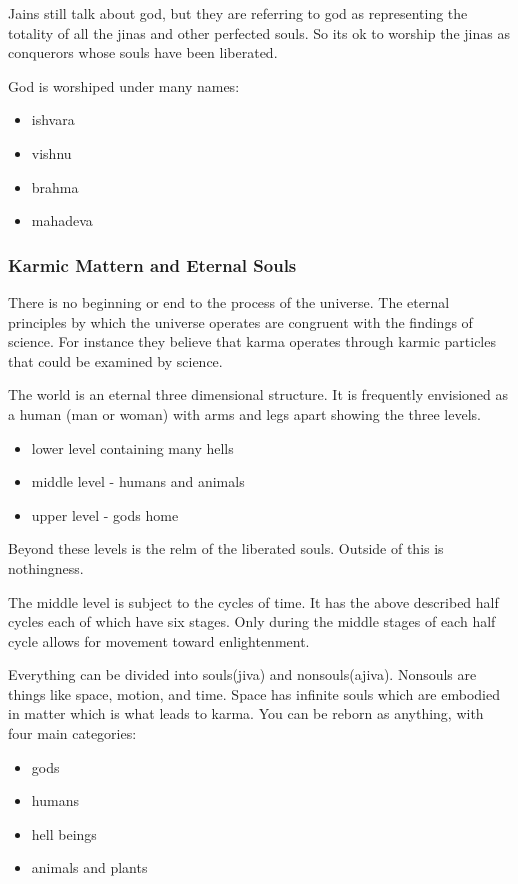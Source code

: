 \documentclass{article}
\begin{document}
Jains still talk about god, but they are referring to god as representing the totality of all the jinas and other perfected souls. So its ok to worship the jinas as conquerors whose souls have been liberated.

God is worshiped under many names:
\begin{itemize}
	\item ishvara
	\item vishnu
	\item brahma
	\item mahadeva
\end{itemize}

\subsubsection{Karmic Mattern and Eternal Souls}
\label{ssub:karmic_mattern_and_eternal_souls}
There is no beginning or end to the process of the universe. The eternal principles by which the universe operates are congruent with the findings of science. For instance they believe that karma operates through karmic particles that could be examined by science.

The world is an eternal three dimensional structure. It is frequently envisioned as a human (man or woman) with arms and legs apart showing the three levels.
\begin{itemize}
	\item lower level containing many hells
	\item middle level - humans and animals
	\item upper level - gods home
\end{itemize}
Beyond these levels is the relm of the liberated souls. Outside of this is nothingness.

The middle level is subject to the cycles of time. It has the above described half cycles each of which have six stages. Only during the middle stages of each half cycle allows for movement toward enlightenment.

Everything can be divided into souls(jiva) and nonsouls(ajiva). Nonsouls are things like space, motion, and time. Space has infinite souls which are embodied in matter which is what leads to karma. You can be reborn as anything, with four main categories:
\begin{itemize}
	\item gods
	\item humans
	\item hell beings
	\item animals and plants
\end{itemize}
\end{document}
